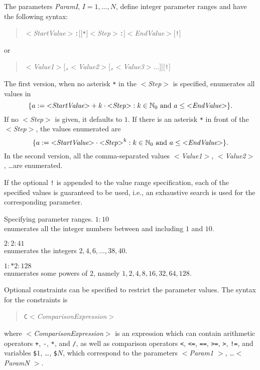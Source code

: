The parameters \textit{ParamI}, $I=1,\dots,N$, define integer parameter ranges and have the following syntax:
\begin{quote}
	\textit{$<$StartValue$>$}\texttt{:}[[\texttt{*}]\textit{$<$Step$>$}\texttt{:}]\textit{$<$EndValue$>$}[\texttt{!}]
\end{quote}
or
\begin{quote}
	\textit{$<$Value1$>$}[\texttt{,}\textit{$<$Value2$>$}[\texttt{,}\textit{$<$Value3$>$}...]][\texttt{!}]
\end{quote}
The first version, when no asterisk \texttt{*} in the \textit{$<$Step$>$} is specified, enumerates all values in
\[
	\{ a := \text{\textit{$<$StartValue$>$}} + k \cdot \text{\textit{$<$Step$>$}} : k \in \mathbb{N}_0 \text{ and } a \leq \text{\textit{$<$EndValue$>$}} \}.
\]
If no \textit{$<$Step$>$} is given, it defaults to $1$.
If there is an asterisk \texttt{*} in front of the \textit{$<$Step$>$}, the values enumerated are
\[
	\{ a := \text{\textit{$<$StartValue$>$}} \cdot \text{\textit{$<$Step$>$}}^k : k \in \mathbb{N}_0 \text{ and } a \leq \text{\textit{$<$EndValue$>$}} \}.
\]
In the second version, all the comma-separated values \textit{$<$Value1$>$}, \textit{$<$Value2$>$}, \dots are enumerated.

If the optional \texttt{!} is appended to the value  range specification,
each of the specified values is guaranteed to be used, i.e., an exhaustive search is used for the corresponding parameter.

\begin{example}{Specifying parameter ranges.}
	\noindent $1:10$\\
	\phantom{XXXX}enumerates all the integer numbers between and including $1$ and $10$.
	\bigskip
	
	\noindent $2:2:41$\\
	\phantom{XXXX}enumerates the integers $2,4,6,\dots,38,40$.
	\bigskip
	
	\noindent $1:*2:128$\\
	\phantom{XXXX}enumerates some powers of $2$, namely $1,2,4,8,16,32,64,128$.
\end{example}

Optional  constraints  can  be  specified  to restrict the parameter values. The syntax for the constraints is
\begin{quote}
	\texttt{C}\textit{$<$ComparisonExpression$>$}
\end{quote}
where \textit{$<$ComparisonExpression$>$} is an expression which can contain arithmetic operators \texttt{+}, \texttt{-}, \texttt{*}, and \texttt{/},
as well as comparison operators \texttt{<}, \texttt{<=}, \texttt{==}, \texttt{>=}, \texttt{>}, \texttt{!=},
and variables \texttt{\$}$1$, \dots, \texttt{\$}$N$, which correspond to the parameters \textit{$<$Param1 $>$}, \dots \textit{$<$ParamN $>$}.

